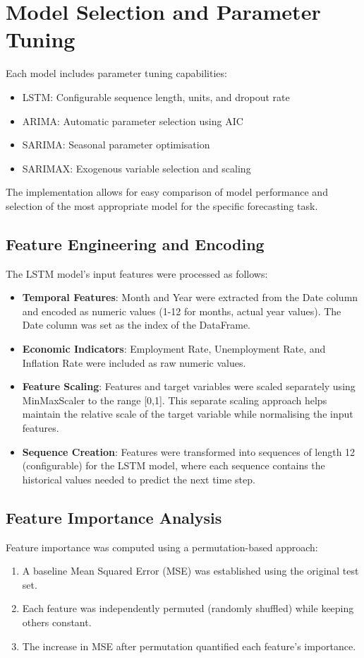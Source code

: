 \documentclass[12pt,a4paper]{report}
\begin{document}
\section{Model Selection and Parameter Tuning}
Each model includes parameter tuning capabilities:

\begin{itemize}
    \item LSTM: Configurable sequence length, units, and dropout rate
    \item ARIMA: Automatic parameter selection using AIC
    \item SARIMA: Seasonal parameter optimisation
    \item SARIMAX: Exogenous variable selection and scaling
\end{itemize}

The implementation allows for easy comparison of model performance and selection of the most appropriate model for the specific forecasting task.

\subsection{Feature Engineering and Encoding}
The LSTM model's input features were processed as follows:
\begin{itemize}
    \item \textbf{Temporal Features}: Month and Year were extracted from the Date column and encoded as numeric values (1-12 for months, actual year values). The Date column was set as the index of the DataFrame.
    \item \textbf{Economic Indicators}: Employment Rate, Unemployment Rate, and Inflation Rate were included as raw numeric values.
    \item \textbf{Feature Scaling}: Features and target variables were scaled separately using MinMaxScaler to the range [0,1]. This separate scaling approach helps maintain the relative scale of the target variable while normalising the input features.
    \item \textbf{Sequence Creation}: Features were transformed into sequences of length 12 (configurable) for the LSTM model, where each sequence contains the historical values needed to predict the next time step.
\end{itemize}

\subsection{Feature Importance Analysis}
Feature importance was computed using a permutation-based approach:
\begin{enumerate}
    \item A baseline Mean Squared Error (MSE) was established using the original test set.
    \item Each feature was independently permuted (randomly shuffled) while keeping others constant.
    \item The increase in MSE after permutation quantified each feature's importance.
\end{enumerate}
\end{document}
